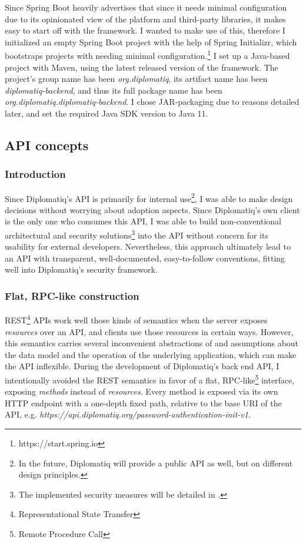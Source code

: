Since Spring Boot heavily advertises that since it needs minimal configuration due to its opinionated view of the platform and third-party libraries, it makes easy to start off with the framework. I wanted to make use of this, therefore I initialized an empty Spring Boot project with the help of Spring Initializr, which bootstraps projects with needing minimal configuration.\footnote{https://start.spring.io} I set up a Java-based project with Maven, using the latest released version of the framework. The project's group name has been \emph{org.diplomatiq}, its artifact name has been \emph{diplomatiq-backend}, and thus its full package name has been \emph{org.diplomatiq.diplomatiq-backend}. I chose JAR-packaging due to reasons detailed later, and set the required Java SDK version to Java 11.

\subsection{API concepts}

\subsubsection{Introduction}

Since Diplomatiq's API is primarily for internal use\footnote{In the future, Diplomatiq will provide a public API as well, but on different design principles.}, I was able to make design decisions without worrying about adoption aspects. Since Diplomatiq's own client is the only one who consumes this API, I was able to build non-conventional architectural and security solutions\footnote{The implemented security measures will be detailed in .} into the API without concern for its usability for external developers. Nevertheless, this approach ultimately lead to an API with transparent, well-documented, easy-to-follow conventions, fitting well into Diplomatiq's security framework.

\subsubsection{Flat, RPC-like construction}

REST\footnote{Representational State Transfer} APIs work well those kinds of semantics when the server exposes \emph{resources} over an API, and clients use those resources in certain ways. However, this semantics carries several inconvenient abstractions of and assumptions about the data model and the operation of the underlying application, which can make the API inflexible. During the development of Diplomatiq's back end API, I intentionally avoided the REST semantics in favor of a flat, RPC-like\footnote{Remote Procedure Call} interface, exposing \emph{methods} instead of \emph{resources}. Every method is exposed via its own HTTP endpoint with a one-depth fixed path, relative to the base URI of the API, e.g. \emph{https://api.diplomatiq.org/password-authentication-init-v1}.

